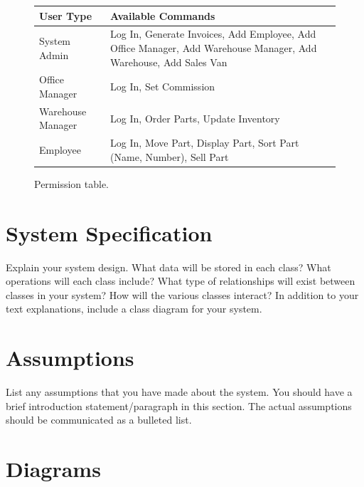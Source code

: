 \documentclass{report}
\begin{document}
\begin{figure}
  \begin{center}
      \begin{tabular}{ | l | p{8cm} |}
      \hline
      User Type & Available Commands \\ \hline
      System Admin & Log In, Generate Invoices, Add Employee, Add Office Manager, Add Warehouse Manager, Add Warehouse, Add Sales Van \\ \hline
      Office Manager & Log In, Set Commission\\ \hline
      Warehouse Manager & Log In, Order Parts, Update Inventory \\ \hline
      Employee & Log In, Move Part, Display Part, Sort Part (Name, Number), Sell Part \\
      \hline
      \end{tabular}
  \end{center}
  \caption{Permission table.}
\end{figure}

\section{System Specification}
\label{sec:spec}

Explain your system design. What data will be stored in each class?  What operations will each class include?  What type of relationships will exist between classes in your system? How will the various classes interact? In addition to your text explanations, include a class diagram for your system.\par

\section{Assumptions}
\label{sec:assume}

List any assumptions that you have made about the system. You should have a brief introduction statement/paragraph in this section. The actual assumptions should be communicated as a bulleted list.\par

\section{Diagrams}
\label{sec:diagram}
\end{document}
